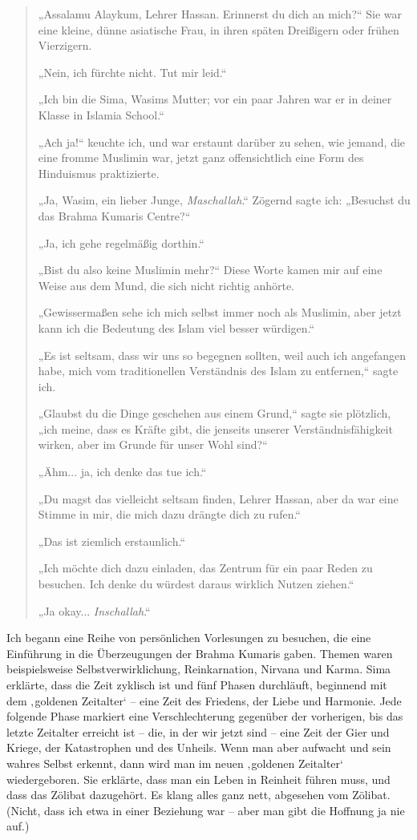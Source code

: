 \documentclass[12pt]{memoir}
\begin{document}
\begin{quote}
„Assalamu Alaykum, Lehrer Hassan.
Erinnerst du dich an mich?“
Sie war eine kleine, dünne asiatische Frau,
in ihren späten Dreißigern oder frühen Vierzigern.

„Nein, ich fürchte nicht. Tut mir leid.“

„Ich bin die Sima, Wasims Mutter;
vor ein paar Jahren war er in deiner Klasse in Islamia School.“

„Ach ja!“ keuchte ich, und war erstaunt darüber zu sehen,
wie jemand, die eine fromme Muslimin war,
jetzt ganz offensichtlich eine Form des Hinduismus praktizierte.

„Ja, Wasim, ein lieber Junge, \emph{Maschallah}.“
Zögernd sagte ich: „Besuchst du das Brahma Kumaris Centre?“

„Ja, ich gehe regelmäßig dorthin.“

„Bist du also keine Muslimin mehr?“
Diese Worte kamen mir auf eine Weise aus dem Mund,
die sich nicht richtig anhörte.

„Gewissermaßen sehe ich mich selbst immer noch als Muslimin,
aber jetzt kann ich die Bedeutung des Islam viel besser würdigen.“

„Es ist seltsam, dass wir uns so begegnen sollten,
weil auch ich angefangen habe,
mich vom traditionellen Verständnis des Islam zu entfernen,“ sagte ich.

„Glaubst du die Dinge geschehen aus einem Grund,“ sagte sie plötzlich,
„ich meine, dass es Kräfte gibt,
die jenseits unserer Verständnisfähigkeit wirken,
aber im Grunde für unser Wohl sind?“

„Ähm... ja, ich denke das tue ich.“

„Du magst das vielleicht seltsam finden, Lehrer Hassan,
aber da war eine Stimme in mir, die mich dazu drängte dich zu rufen.“

„Das ist ziemlich erstaunlich.“

„Ich möchte dich dazu einladen, das Zentrum für ein paar Reden zu besuchen.
Ich denke du würdest daraus wirklich Nutzen ziehen.“

„Ja okay... \emph{Inschallah}.“
\end{quote}

Ich begann eine Reihe von persönlichen Vorlesungen zu besuchen,
die eine Einführung in die Überzeugungen der Brahma Kumaris gaben.
Themen waren beispielsweise Selbstverwirklichung,
Reinkarnation, Nirvana und Karma.
Sima erklärte, dass die Zeit zyklisch ist und fünf Phasen durchläuft,
beginnend mit dem ‚goldenen Zeitalter‘ –
eine Zeit des Friedens, der Liebe und Harmonie.
Jede folgende Phase markiert eine Verschlechterung gegenüber der vorherigen,
bis das letzte Zeitalter erreicht ist – die, in der wir jetzt sind –
eine Zeit der Gier und Kriege, der Katastrophen und des Unheils.
Wenn man aber aufwacht und sein wahres Selbst erkennt,
dann wird man im neuen ‚goldenen Zeitalter‘ wiedergeboren.
Sie erklärte, dass man ein Leben in Reinheit führen muss,
und dass das Zölibat dazugehört.
Es klang alles ganz nett, abgesehen vom Zölibat.
(Nicht, dass ich etwa in einer Beziehung war –
aber man gibt die Hoffnung ja nie auf.)
\end{document}
